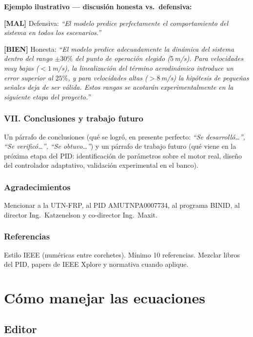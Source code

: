 \documentclass[11pt,a4paper]{article}
\newcommand{\malo}{\textcolor{red!70!black}{\textbf{[MAL]}}}
\newcommand{\bueno}{\textcolor{green!50!black}{\textbf{[BIEN]}}}
\begin{document}
\begin{ejemplo}
\textbf{Ejemplo ilustrativo --- discusión honesta vs.\ defensiva:}

\malo{} Defensiva: \textit{``El modelo predice perfectamente el comportamiento del sistema en todos los escenarios.''}

\bueno{} Honesta: \textit{``El modelo predice adecuadamente la dinámica del sistema dentro del rango $\pm 30\%$ del punto de operación elegido ($5\,$m/s). Para velocidades muy bajas ($<1\,$m/s), la linealización del término aerodinámico introduce un error superior al $25\%$, y para velocidades altas ($>8\,$m/s) la hipótesis de pequeñas señales deja de ser válida. Estos rangos se acotarán experimentalmente en la siguiente etapa del proyecto.''}
\end{ejemplo}

\subsubsection{VII. Conclusiones y trabajo futuro}

Un párrafo de conclusiones (qué se logró, en presente perfecto: \textit{``Se desarrolló\dots'', ``Se verificó\dots'', ``Se obtuvo\dots''}) y un párrafo de trabajo futuro (qué viene en la próxima etapa del PID: identificación de parámetros sobre el motor real, diseño del controlador adaptativo, validación experimental en el banco).

\subsubsection{Agradecimientos}

Mencionar a la UTN-FRP, al PID AMUTNPA0007734, al programa BINID, al director Ing.\ Katzenelson y co-director Ing.\ Maxit.

\subsubsection{Referencias}

Estilo IEEE (numéricas entre corchetes). Mínimo 10 referencias. Mezclar libros del PID, papers de IEEE Xplore y normativa cuando aplique.

\hrulefill

\section{Cómo manejar las ecuaciones}

\subsection{Editor}
\end{document}
